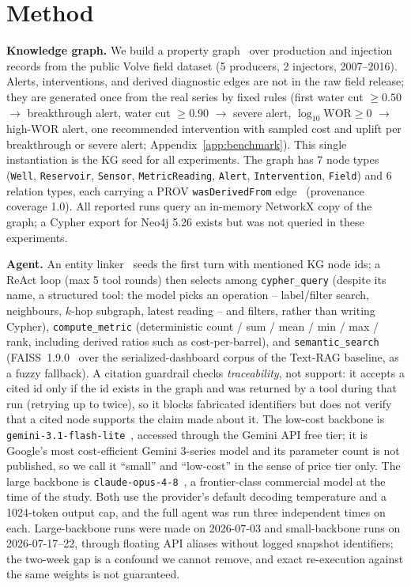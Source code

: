 \documentclass{article}
\begin{document}
\section{Method}

\textbf{Knowledge graph.} We build a property graph~\cite{graphdb2008} over production and injection records from the public
Volve field dataset (5 producers, 2 injectors, 2007--2016). Alerts,
interventions, and derived diagnostic edges are not in the raw field release;
they are generated once from the real series by fixed rules (first water cut
$\geq 0.50$ $\to$ breakthrough alert, water cut $\geq 0.90$ $\to$ severe alert,
$\log_{10}\mathrm{WOR} \geq 0$ $\to$ high-WOR alert, one recommended
intervention with sampled cost and uplift per breakthrough or severe alert;
Appendix~\ref{app:benchmark}). This single instantiation is the KG seed for all
experiments. The graph has 7 node types (\texttt{Well}, \texttt{Reservoir},
\texttt{Sensor}, \texttt{MetricReading}, \texttt{Alert},
\texttt{Intervention}, \texttt{Field}) and 6 relation types, each carrying a
PROV \texttt{wasDerivedFrom} edge~\cite{provo2013} (provenance coverage 1.0).
All reported runs query an in-memory NetworkX copy of the graph; a Cypher export
for Neo4j 5.26 exists but was not queried in these experiments.

\textbf{Agent.} An entity linker~\cite{entitylink2015} seeds the first turn
with mentioned KG node ids; a ReAct loop (max 5 tool rounds) then selects among
\texttt{cypher\_query} (despite its name, a structured tool: the model picks
an operation -- label/filter search, neighbours, $k$-hop subgraph, latest
reading -- and filters, rather than writing Cypher), \texttt{compute\_metric} (deterministic count / sum / mean /
min / max / rank, including derived ratios such as cost-per-barrel), and
\texttt{semantic\_search} (FAISS~1.9.0~\cite{faiss2017} over the
serialized-dashboard corpus of the Text-RAG baseline, as a fuzzy fallback). A
citation guardrail checks \emph{traceability}, not support: it accepts a cited
id only if the id exists in the graph and was returned by a tool during that
run (retrying up to twice), so it blocks fabricated identifiers but does not
verify that a cited node supports the claim made about it. The low-cost
backbone is \texttt{gemini-3.1-flash-lite}~\cite{gemini31flashlite}, accessed
through the Gemini API free tier; it is Google's most cost-efficient Gemini
3-series model and its parameter count is not published, so we call it
``small'' and ``low-cost'' in the sense of price tier only. The large backbone is
\texttt{claude-opus-4-8}~\cite{claudeopus48}, a frontier-class commercial model
at the time of the study. Both use the provider's default decoding temperature
and a 1024-token output cap, and the full agent was run three independent
times on each. Large-backbone runs were made on 2026-07-03 and small-backbone
runs on 2026-07-17--22, through floating API aliases without logged snapshot
identifiers; the two-week gap is a confound we cannot remove, and exact
re-execution against the same weights is not guaranteed.
\end{document}
